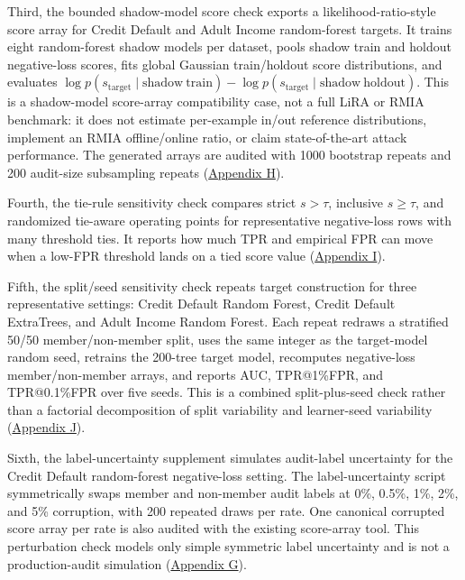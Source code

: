 \documentclass[
  10pt,
  twocolumn]{article}
\begin{document}
Third, the bounded shadow-model score check exports a likelihood-ratio-style score array for Credit Default and Adult Income random-forest targets. It trains eight random-forest shadow models per dataset, pools shadow train and holdout negative-loss scores, fits global Gaussian train/holdout score distributions, and evaluates \(\log p(s_{\mathrm{target}}\mid \mathrm{shadow\ train})-\log p(s_{\mathrm{target}}\mid \mathrm{shadow\ holdout})\). This is a shadow-model score-array compatibility case, not a full LiRA or RMIA benchmark: it does not estimate per-example in/out reference distributions, implement an RMIA offline/online ratio, or claim state-of-the-art attack performance. The generated arrays are audited with 1000 bootstrap repeats and 200 audit-size subsampling repeats (\protect\hyperlink{appendix-h-bounded-shadow-model-score-check}{Appendix H}).

Fourth, the tie-rule sensitivity check compares strict \(s>\tau\), inclusive \(s\geq\tau\), and randomized tie-aware operating points for representative negative-loss rows with many threshold ties. It reports how much TPR and empirical FPR can move when a low-FPR threshold lands on a tied score value (\protect\hyperlink{appendix-i-tie-rule-sensitivity}{Appendix I}).

Fifth, the split/seed sensitivity check repeats target construction for three representative settings: Credit Default Random Forest, Credit Default ExtraTrees, and Adult Income Random Forest. Each repeat redraws a stratified 50/50 member/non-member split, uses the same integer as the target-model random seed, retrains the 200-tree target model, recomputes negative-loss member/non-member arrays, and reports AUC, TPR@1\%FPR, and TPR@0.1\%FPR over five seeds. This is a combined split-plus-seed check rather than a factorial decomposition of split variability and learner-seed variability (\protect\hyperlink{appendix-j-splitseed-sensitivity}{Appendix J}).

Sixth, the label-uncertainty supplement simulates audit-label uncertainty for the Credit Default random-forest negative-loss setting. The label-uncertainty script symmetrically swaps member and non-member audit labels at 0\%, 0.5\%, 1\%, 2\%, and 5\% corruption, with 200 repeated draws per rate. One canonical corrupted score array per rate is also audited with the existing score-array tool. This perturbation check models only simple symmetric label uncertainty and is not a production-audit simulation (\protect\hyperlink{appendix-g-label-uncertainty-check}{Appendix G}).
\end{document}
